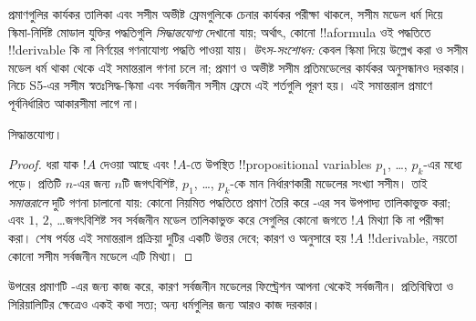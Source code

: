 \documentclass[../../../include/open-logic-section]{subfiles}
\begin{document}

প্রমাণগুলির কার্যকর তালিকা এবং সসীম অভীষ্ট ফ্রেমগুলিকে চেনার কার্যকর পরীক্ষা থাকলে, সসীম মডেল ধর্ম দিয়ে স্কিমা-নির্দিষ্ট মোডাল যুক্তির পদ্ধতিগুলি \emph{সিদ্ধান্তযোগ্য} দেখানো যায়; অর্থাৎ, কোনো !!a{formula} ওই পদ্ধতিতে !!{derivable} কি না নির্ণয়ের গণনাযোগ্য পদ্ধতি পাওয়া যায়।
\emph{উৎস-সংশোধন:} কেবল স্কিমা দিয়ে উল্লেখ করা ও সসীম মডেল ধর্ম থাকা থেকে এই সমান্তরাল গণনা চলে না; প্রমাণ ও অভীষ্ট সসীম প্রতিমডেলের কার্যকর অনুসন্ধানও দরকার। নিচে S5-এর সসীম স্বতঃসিদ্ধ-স্কিমা এবং সর্বজনীন সসীম ফ্রেমে এই শর্তগুলি পূরণ হয়। এই সমান্তরাল প্রমাণে পূর্বনির্ধারিত আকারসীমা লাগে না।


\begin{thm}
   সিদ্ধান্তযোগ্য।
\end{thm}

\begin{proof}
  ধরা যাক $!A$ দেওয়া আছে এবং $!A$-তে উপস্থিত !!{propositional variable}s $p_1$, \dots, $p_k$-এর মধ্যে পড়ে। প্রতিটি $n$-এর জন্য $n$টি জগৎবিশিষ্ট, $p_1$, \dots, $p_k$-কে মান নির্ধারণকারী মডেলের সংখ্যা সসীম। তাই \emph{সমান্তরালে} দুটি গণনা চালানো যায়: কোনো নিয়মিত পদ্ধতিতে প্রমাণ তৈরি করে -এর সব উপপাদ্য তালিকাভুক্ত করা; এবং $1$, $2$, \dots জগৎবিশিষ্ট সব সর্বজনীন মডেল তালিকাভুক্ত করে সেগুলির কোনো জগতে $!A$ মিথ্যা কি না পরীক্ষা করা। শেষ পর্যন্ত এই সমান্তরাল প্রক্রিয়া দুটির একটি উত্তর দেবে; কারণ  ও  অনুসারে হয় $!A$ !!{derivable}, নয়তো কোনো সসীম সর্বজনীন মডেলে এটি মিথ্যা।
\end{proof}

উপরের প্রমাণটি -এর জন্য কাজ করে, কারণ সর্বজনীন মডেলের ফিল্ট্রেশন আপনা থেকেই সর্বজনীন। প্রতিবিম্বিতা ও সিরিয়ালিটির ক্ষেত্রেও একই কথা সত্য; অন্য ধর্মগুলির জন্য আরও কাজ দরকার।
\end{document}
